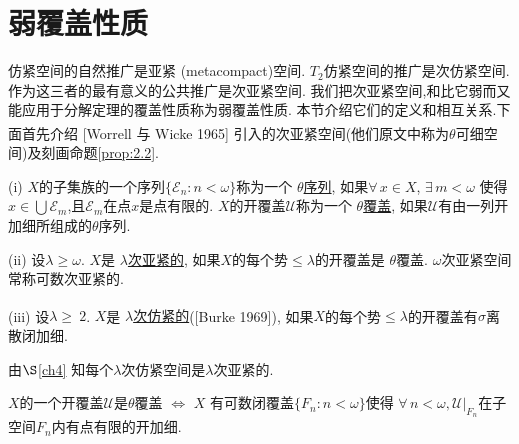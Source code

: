 \documentclass[main.tex]{subfiles}
\begin{document}
\chapter{弱覆盖性质}\label{ch2}

仿紧空间的自然推广是亚紧
(metacompact)空间.
$T_2$仿紧空间的推广是次仿紧空间.
作为这三者的最有意义的公共推广是次亚紧空间.
我们把次亚紧空间,和比它弱而又能应用于分解定理的覆盖性质称为弱覆盖性质.
本节介绍它们的定义和相互关系.下面首先介绍 [Worrell 与
Wicke 1965]\textsuperscript{\cite{WorrellWicke}}
引入的次亚紧空间(他们原文中称为$\theta$可细空间)及刻画命题\ref{prop:2.2}.

\begin{definition} \label{def:2.1}
(i) $X$的子集族的一个序列$\{\mathscr{E}_n:n<\omega\}$称为一个
\underline{$\theta$序列},
如果$\forall\, x\in X$, $ \exists\, m < \omega$ 使得$x\in\bigcup \mathscr{E}_m$,且$\mathscr{E}_m$在点$x$是点有限的.
$X$的开覆盖$\mathscr{U}$称为一个 
\underline{$\theta$覆盖},
如果$\mathscr{U}$有由一列开加细所组成的$\theta$序列.

(ii) 设$\lambda\ge\omega$. $X$是 
\underline{$\lambda$次亚紧的},
如果$X$的每个势$\le\lambda$的开覆盖是
$\theta$覆盖.
$\omega$次亚紧空间常称可数次亚紧的.

(iii) 设$\lambda\ge\ 2$. $X$是
\underline{$\lambda$次仿紧的}([Burke 1969]\textsuperscript{\cite{Burke1969}}),
如果$X$的每个势$\le\lambda$的开覆盖有$\sigma$离散闭加细.
\end{definition}

由$\S$\ref{ch4} 知每个$\lambda$次仿紧空间是$\lambda$次亚紧的.

\begin{proposition}\label{prop:2.2}
$X$的一个开覆盖$\mathscr{U}$是$\theta$覆盖 $\Leftrightarrow$
$X$ 有可数闭覆盖$\{F_n: n<\omega\}$使得
$\forall \, n < \omega, \mathscr{U}|_{F_n}$在子空间$F_n$内有点有限的开加细.
\end{proposition}
\end{document}
